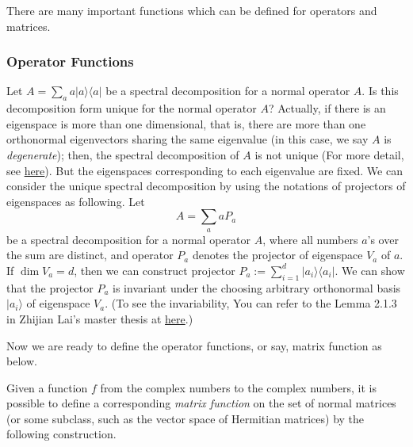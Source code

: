 
There are many important functions which can be defined for operators and matrices. 

\subsubsection{Operator Functions}

Let $A=\sum_{a} a|a\rangle\langle a|$ be a spectral decomposition for a normal operator $A$. Is this decomposition form unique for the normal operator $A$? Actually, if there is an eigenspace is more than one dimensional, that is, there are more than one orthonormal eigenvectors sharing the same eigenvalue (in this case, we say $A$ is \textit{degenerate}); then, the spectral decomposition of $A$ is not unique (For more detail, see \href{https://physics.stackexchange.com/questions/576287/uniqueness-of-spectral-decomposition}{here}). But the eigenspaces corresponding to each eigenvalue are fixed. We can consider the unique spectral decomposition by using the notations of projectors of eigenspaces as following. Let 
\begin{equation}
    A=\sum_{a} a P_{a}
\end{equation}
be a spectral decomposition for a normal operator $A$, where all numbers $a$'s over the sum are distinct, and operator $P_{a}$ denotes the projector of eigenspace $V_a$ of $a.$ If $\dim V_a =d$, then we can construct projector $P_a:= \sum_{i=1}^{d} |a_{i}\rangle\langle a_{i}|$. We can show that the projector $P_a$ is invariant under the choosing arbitrary orthonormal basis $|a_{i}\rangle$ of eigenspace $V_a$. (To see the invariability, You can refer to the Lemma 2.1.3 in Zhijian Lai's master thesis at \href{https://galvinlai.github.io/files/doc/master_thesis_2021.pdf}{here}.)

Now we are ready to define the operator functions, or say, matrix function as below.

Given a function $f$ from the complex numbers to the complex numbers, it is possible to define a corresponding \textit{matrix function} on the set of normal matrices (or some subclass, such as the vector space of Hermitian matrices) by the following construction. 

